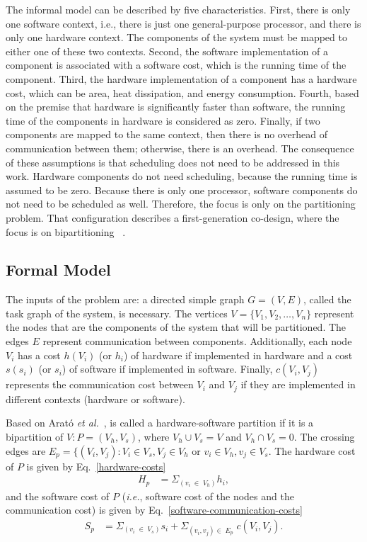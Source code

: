 The informal model can be described by five characteristics. First, there is only one software context, i.e., there is just one general-purpose processor, and there is only one hardware context. The components of the system must be mapped to either one of these two contexts. Second, the software implementation of a component is associated with a software cost, which is the running time of the component. Third, the hardware implementation of a component has a hardware cost, which can be area, heat dissipation, and energy consumption. Fourth, based on the premise that hardware is significantly faster than software, the running time of the components in hardware is considered as zero. Finally, if two components are mapped to the same context, then there is no overhead of communication between them; otherwise, there is an overhead. The consequence of these assumptions is that scheduling does not need to be addressed in this work. Hardware components do not need scheduling, because the running time is assumed to be zero. Because there is only one processor, software components do not need to be scheduled as well. Therefore, the focus is only on the partitioning problem. That configuration describes a first-generation co-design, where the focus is on bipartitioning ~\cite{Teich2012}.

\subsection{Formal Model}
\label{Formal-Model}

The inputs of the problem are: a directed simple graph $ G = (V,E) $, called the task graph of the system, is necessary. The vertices $V = \{V_1,V_2,\dotso,V_n\}$ represent the nodes that are the components of the system that will be partitioned. The edges $E$ represent communication between components. Additionally, each node  $V_i$ has a cost $h(V_i)$ (or $h_i$) of hardware if implemented in hardware and a cost $s(s_i)$ (or $ s_i $) of software if implemented in software. Finally, $c(V_i,V_j)$ represents the communication cost between $V_i$ and $V_j$ if they are implemented in different contexts (hardware or software).

Based on Arat\'o {\it et al.}~\cite{Arato2003}, is called a hardware-software partition if it is a bipartition of $V:P = (V_h, V_s)$, where $V_h \cup V_s = V$  and $V_h \cap V_s = 0$. The crossing edges are $E_p = \{(V_i,V_j):V_i \in V_s, V_j \in V_h$ or $v_i \in V_h, v_j \in V_s $. The hardware cost of $P$ is given by Eq.~\ref{hardware-costs}
%
\begin{align}
\label{hardware-costs}
 H_p &= \Sigma_{\left(v_i \;\in\; V_h\right)} h_i,
\end{align}
%
\noindent and the software cost of $P$ ({\it i.e.}, software cost of the nodes and the communication cost) is given by Eq.~\ref{software-communication-costs}
%
\begin{align}
\label{software-communication-costs}
  S_p &= \Sigma_{\left(v_i \;\in\; V_s\right)} s_i + \Sigma_{(v_i,v_j) \in\; E_p}\; c(V_i, V_j).
\end{align}

